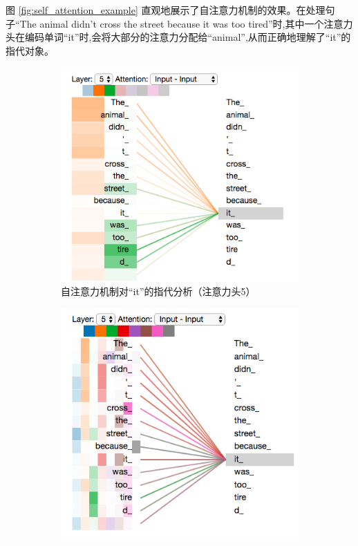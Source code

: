 图 \ref{fig:self_attention_example} 直观地展示了自注意力机制的效果。在处理句子“The animal didn't cross the street because it was too tired”时,其中一个注意力头在编码单词“it”时,会将大部分的注意力分配给“animal”,从而正确地理解了“it”的指代对象。
\begin{figure}[htbp]
    \centering
    \begin{subfigure}[b]{0.48\textwidth}
        \centering
        \includegraphics[width=\textwidth]{figures/T5.png}
        \caption{自注意力机制对“it”的指代分析（注意力头5）}
        \label{fig:self_attention_it_1}
    \end{subfigure}
    \hfill
    \begin{subfigure}[b]{0.48\textwidth}
        \centering
        \includegraphics[width=\textwidth]{figures/T6.png}

\end{subfigure}
\end{figure}
